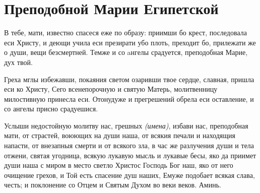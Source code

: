 \section{Преподобной Марии Египетской}\begin{mymulticols}


В тебе, мати, известно спасеся еже по образу: приимши бо крест, последовала еси Христу, и деющи учила еси презирати убо плоть, преходит бо, прилежати же о души, вещи безсмертней. Темже и со aнгелы срадуется, преподобная Марие, дух твой.


Греха мглы избежавши, покаяния светом озаривши твое сердце, славная, пришла еси ко Христу, Сего всенепорочную и святую Матерь, молитвенницу милостивную принесла еси. Отонудуже и прегрешений обрела еси оставление, и со ангелы присно срадуешися.


Услыши недостойную молитву нас, грешных {\itshape (имена)}, избави нас, преподобная мати, от страстей, воюющих на души наша, от всякия печали и находящия напасти, от внезапныя смерти и от всякого зла, в час же разлучения души и тела отжени, святая угодница, всякую лукавую мысль и лукавые бесы, яко да приимет души наша с миром в место светло Христос Господь Бог наш, яко от него очищение грехов, и Той есть спасение душ наших, Емуже подобает всякая слава, честь; и поклонение со Отцем и Святым Духом во веки веков. Аминь.


\end{mymulticols}


